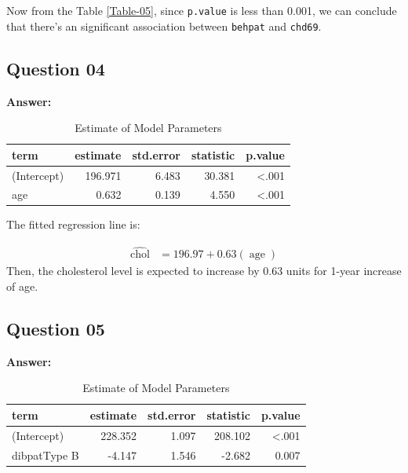 \documentclass[
  12pt,
  oneside]{article}
\begin{document}
Now from the Table \ref{Table-05}, since \texttt{p.value} is less than 0.001, we can conclude that there's an significant association between \texttt{behpat} and \texttt{chd69}.

\clearpage

\hypertarget{question-04}{%
\subsection{Question 04}\label{question-04}}

\textbf{Answer:}

\begin{table}[H]

\caption{\label{tab:Table-06}Estimate of Model Parameters}
\centering
\begin{tabular}[t]{lrrrr}
\toprule
term & estimate & std.error & statistic & p.value\\
\midrule
(Intercept) & 196.971 & 6.483 & 30.381 & <.001\\
age & 0.632 & 0.139 & 4.550 & <.001\\
\bottomrule
\end{tabular}
\end{table}

The fitted regression line is:

\begin{equation}
\label{eq: eq1}
\begin{aligned}
\operatorname{\widehat{chol}} &= 196.97 + 0.63(\operatorname{age})
\end{aligned}
\end{equation}
Then, the cholesterol level is expected to increase by 0.63 units
for 1-year increase of age.

\hypertarget{question-05}{%
\subsection{Question 05}\label{question-05}}

\textbf{Answer:}

\begin{table}[H]

\caption{\label{tab:Table-07}Estimate of Model Parameters}
\centering
\begin{tabular}[t]{lrrrr}
\toprule
term & estimate & std.error & statistic & p.value\\
\midrule
(Intercept) & 228.352 & 1.097 & 208.102 & <.001\\
dibpatType B & -4.147 & 1.546 & -2.682 & 0.007\\
\bottomrule
\end{tabular}
\end{table}
\end{document}
